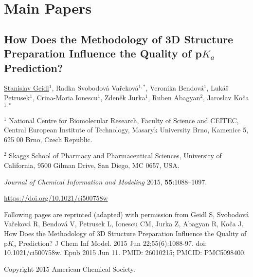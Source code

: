 \chapter{Main Papers}
\label{chapter:papers}

\clearpage

\begin{center}
\section{\centering How Does the Methodology of 3D Structure
Preparation Influence the Quality of p$K_a$ Prediction?}
    
\underline{Stanislav Geidl$^1$}, Radka Svobodová Vařeková$^{1, *}$,
Veronika Bendová$^1$, Lukáš Petrusek$^1$, Crina-Maria Ionescu$^1$,
Zdeněk Jurka$^1$, Ruben Abagyan$^2$, Jaroslav Koča$^{1, *}$

\vspace{1cm}

$^1$ National Centre for Biomolecular Research, Faculty of Science and CEITEC,
Central European Institute of Technology, Masaryk University Brno, Kamenice 5,
625 00 Brno, Czech Republic.

$^2$ Skaggs School of Pharmacy and Pharmaceutical Sciences, University of
California, 9500 Gilman Drive, San Diego, MC 0657, USA.

\vspace{1cm}

\textit{Journal of Chemical Information and  Modeling} 2015, \textbf{55}:1088–1097.

\vspace{1cm}

\url{https://doi.org/10.1021/ci500758w}

\vspace{1cm}

Following pages are reprinted (adapted) with permission from 
Geidl S, Svobodová Vařeková R, Bendová V, Petrusek L, Ionescu CM,
Jurka Z, Abagyan R, Koča J. How Does the Methodology of 3D Structure
Preparation Influence the Quality of p$K_a$ Prediction? J Chem Inf Model.
2015 Jun 22;55(6):1088-97. doi: 10.1021/ci500758w. Epub 2015 Jun 11.
PMID: 26010215; PMCID: PMC5098400.

Copyright 2015 American Chemical Society.

\end{center}





